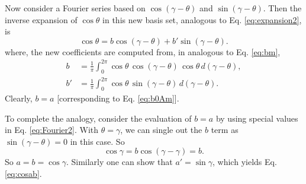 \documentclass[11pt]{article}
\begin{document}
Now consider a Fourier series based on $\cos(\gamma - \theta)$
and $\sin(\gamma - \theta)$.
Then the inverse expansion of $\cos\theta$
in this new basis set, analogous to Eq. \eqref{eq:expansion2}, is
\begin{equation}
  \cos\theta
  =
  b \cos(\gamma - \theta)
+
  b' \sin(\gamma - \theta).
  \label{eq:Fourier2}
\end{equation}
where,
the new coefficients are computed from,
in analogous to Eq. \eqref{eq:bm},
\begin{align}
b &= \frac{1}{\pi} \int_0^{2\pi}
  \cos\theta \, \cos(\gamma - \theta) \, \cos\theta \, d(\gamma - \theta),
  \label{eq:c2}
\\
b' &= \frac{1}{\pi} \int_0^{2\pi}
  \cos\theta \, \sin(\gamma - \theta) \, d(\gamma - \theta).
  \label{eq:s2}
\end{align}
Clearly, $b = a$ [corresponding to Eq. \eqref{eq:b0Am}].

To complete the analogy,
consider the evaluation of $b = a$
by using special values in
Eq. \eqref{eq:Fourier2}.
%
With $\theta = \gamma$,
we can single out the $b$ term
as $\sin(\gamma - \theta) = 0$
in this case.
%
So
\begin{equation}
  \cos\gamma
=
  b \cos(\gamma - \gamma)
= b.
\end{equation}
So $a = b = \cos\gamma$.
%
Similarly one can show that $a' = \sin\gamma$,
which yields Eq. \eqref{eq:cosab}.





\end{document}
